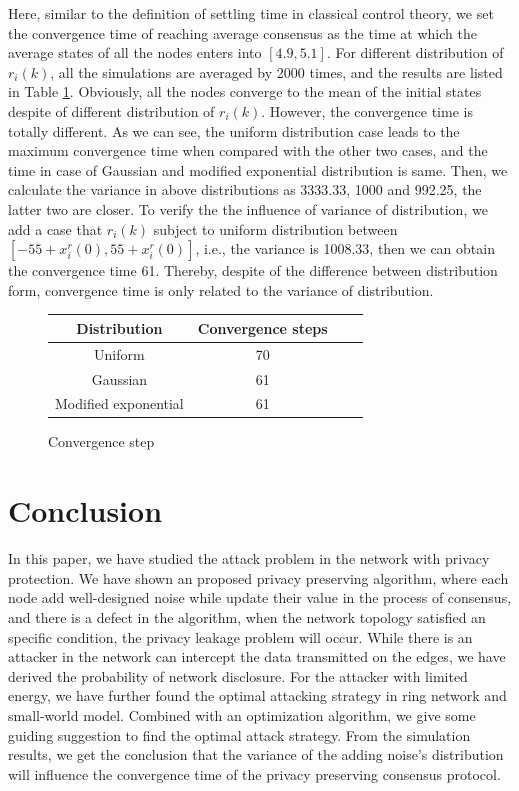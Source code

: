 \documentclass[10pt,journal,compsoc]{IEEEtran}
\begin{document}
Here, similar to the definition of settling time in classical control theory, we set the convergence time of reaching average consensus as the time at which the average states of all the nodes enters into $[4.9,5.1]$. For different distribution of $r_i(k)$, all the simulations are averaged by 2000 times, and the results are listed in Table \ref{convergence step}. Obviously, all the nodes converge to the mean of the initial states despite of different distribution of $r_i(k)$. However, the convergence time is totally different. As we can see, the uniform distribution case leads to the maximum convergence time when compared with the other two cases, and the time in case of Gaussian and modified exponential distribution is same. Then, we calculate the variance in above distributions as 3333.33, 1000 and 992.25, the latter two are closer. To verify the the influence of variance of distribution, we add a case that $r_{i}(k)$ subject to uniform distribution between $[-55+x_{i}^{r}(0),55+x_{i}^{r}(0)]$, i.e., the variance is 1008.33, then we can obtain the convergence time 61. Thereby, despite of the difference between distribution form, convergence time is only related to the variance of distribution.

\begin{figure}[!htb]
\centering
\begin{tabular}{cccc}
Distribution & Convergence steps \\\hline
Uniform & 70\\ \hline
Gaussian  &61 \\ \hline
Modified exponential &61 \\ \hline
\end{tabular}
\captionsetup{type=table}
\caption{Convergence step}\label{convergence step}
\end{figure}


\section{Conclusion} \label{Conclusion}
In this paper, we have studied the attack problem in the network with privacy protection. We have shown an proposed privacy preserving algorithm, where each node add well-designed noise while update their value in the process of consensus, and there is a defect in the algorithm, when the network topology satisfied an specific condition, the privacy leakage problem will occur. While there is an attacker in the network can intercept the data transmitted on the edges, we have derived the probability of network disclosure. For the attacker with limited energy, we have further found the optimal attacking strategy in ring network and small-world model. Combined with an optimization algorithm, we give some guiding suggestion to find the optimal attack strategy. From the simulation results, we get the conclusion that the variance of the adding noise's distribution will influence the convergence time of the privacy preserving consensus protocol.
\end{document}
